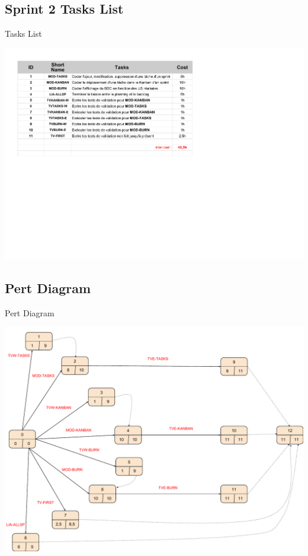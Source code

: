 \documentclass{beamer}
\begin{document}
\subsection{Sprint 2 Tasks List}

\begin{frame}{Tasks List}
	\begin{center}
        \includegraphics[scale=0.52]{Sprint4TasksList.pdf}
        \end{center}
\end{frame}

\subsection{Pert Diagram}

\begin{frame}{Pert Diagram}
	\begin{center}
       \includegraphics[scale=0.32]{Pert4.pdf}
        \end{center}
\end{frame}
\end{document}
